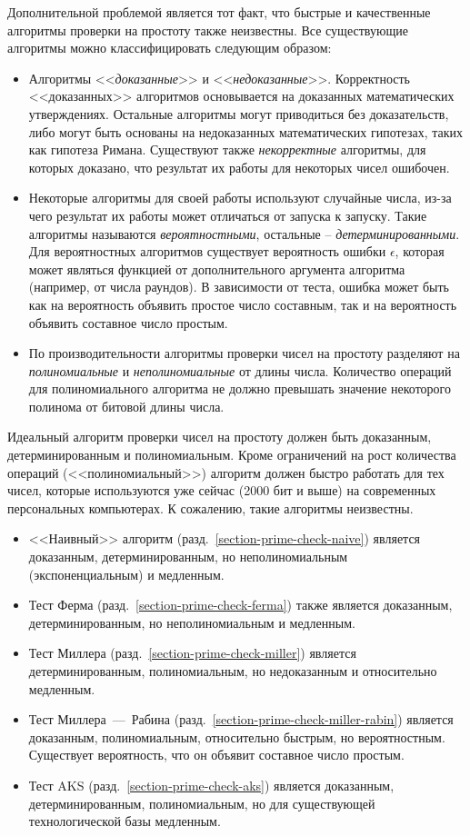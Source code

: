Дополнительной проблемой является тот факт, что быстрые и качественные алгоритмы проверки на простоту также неизвестны. Все существующие алгоритмы можно классифицировать следующим образом:
\begin{itemize}
	\item Алгоритмы <<\emph{доказанные}>> и <<\emph{недоказанные}>>. Корректность <<доказанных>> алгоритмов основывается на доказанных математических утверждениях. Остальные алгоритмы могут приводиться без доказательств, либо могут быть основаны на недоказанных математических гипотезах, таких как гипотеза Римана. Существуют также \emph{некорректные} алгоритмы, для которых доказано, что результат их работы для некоторых чисел ошибочен.
	\item Некоторые алгоритмы для своей работы используют случайные числа, из-за чего результат их работы может отличаться от запуска к запуску. Такие алгоритмы называются \emph{вероятностными}, остальные -- \emph{детерминированными}. Для вероятностных алгоритмов существует вероятность ошибки $\epsilon$, которая может являться функцией от дополнительного аргумента алгоритма (например, от числа раундов). В зависимости от теста, ошибка может быть как на вероятность объявить простое число составным, так и на вероятность объявить составное число простым.
	\item По производительности алгоритмы проверки чисел на простоту разделяют на \emph{полиномиальные} и \emph{неполиномиальные} от длины числа. Количество операций для полиномиального алгоритма не должно превышать значение некоторого полинома от битовой длины числа.
\end{itemize}

Идеальный алгоритм проверки чисел на простоту должен быть доказанным, детерминированным и полиномиальным. Кроме ограничений на рост количества операций (<<полиномиальный>>) алгоритм должен быстро работать для тех чисел, которые используются уже сейчас (2000 бит и выше) на современных персональных компьютерах. К сожалению, такие алгоритмы неизвестны.

\begin{itemize}
	\item <<Наивный>> алгоритм (разд.~\ref{section-prime-check-naive}) является доказанным, детерминированным, но неполиномиальным (экспоненциальным) и медленным.
	\item Тест Ферма (разд.~\ref{section-prime-check-ferma}) также является доказанным, детерминированным, но неполиномиальным и медленным.
	\item Тест Миллера (разд.~\ref{section-prime-check-miller}) является детерминированным, полиномиальным, но недоказанным и относительно медленным.
	\item Тест Миллера~---~Рабина (разд.~\ref{section-prime-check-miller-rabin}) является доказанным, полиномиальным, относительно быстрым, но вероятностным. Существует вероятность, что он объявит составное число простым.
	\item Тест AKS (разд.~\ref{section-prime-check-aks}) является доказанным, детерминированным, полиномиальным, но для существующей технологической базы медленным.
\end{itemize}

